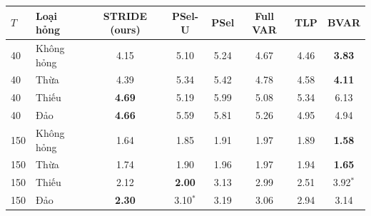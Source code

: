 \begin{tabular}{llcccccc}
\toprule
$T$ & Loại hỏng & STRIDE (ours) & PSel-U & PSel & Full VAR & TLP & BVAR \\
\midrule
40 & Không hỏng & 4.15 & 5.10 & 5.24 & 4.67 & 4.46 & \textbf{3.83} \\
40 & Thừa & 4.39 & 5.34 & 5.42 & 4.78 & 4.58 & \textbf{4.11} \\
40 & Thiếu & \textbf{4.69} & 5.19 & 5.99 & 5.08 & 5.34 & 6.13 \\
40 & Đảo & \textbf{4.66} & 5.59 & 5.81 & 5.26 & 4.95 & 4.94 \\
150 & Không hỏng & 1.64 & 1.85 & 1.91 & 1.97 & 1.89 & \textbf{1.58} \\
150 & Thừa & 1.74 & 1.90 & 1.96 & 1.97 & 1.94 & \textbf{1.65} \\
150 & Thiếu & 2.12 & \textbf{2.00} & 3.13 & 2.99 & 2.51 & 3.92$^{*}$ \\
150 & Đảo & \textbf{2.30} & 3.10$^{*}$ & 3.19 & 3.06 & 2.94 & 3.14 \\
\bottomrule
\end{tabular}
